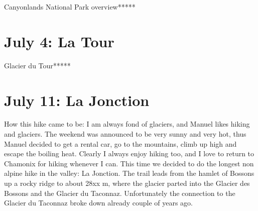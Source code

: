 Canyonlands National Park overview*****

\section{July 4: La Tour}
\label{LaTour2015}

Glacier du Tour*****

\section{July 11: La Jonction}
\label{Jonction2014}

How this hike came to be: I am always fond of glaciers, and Manuel likes hiking and glaciers. The weekend was announced to be very sunny and very hot, thus Manuel decided to get a rental car, go to the mountains, climb up high and escape the boiling heat. Clearly I always enjoy hiking too, and I love to return to Chamonix for hiking whenever I can. This time we decided to do the longest non alpine hike in the valley: La Jonction. The trail leads from the hamlet of Bossons up a rocky ridge to about 28xx m, where the glacier parted into the Glacier des Bossons and the Glacier du Taconnaz. Unfortunately the connection to the Glacier du Taconnaz broke down already couple of years ago.\\

